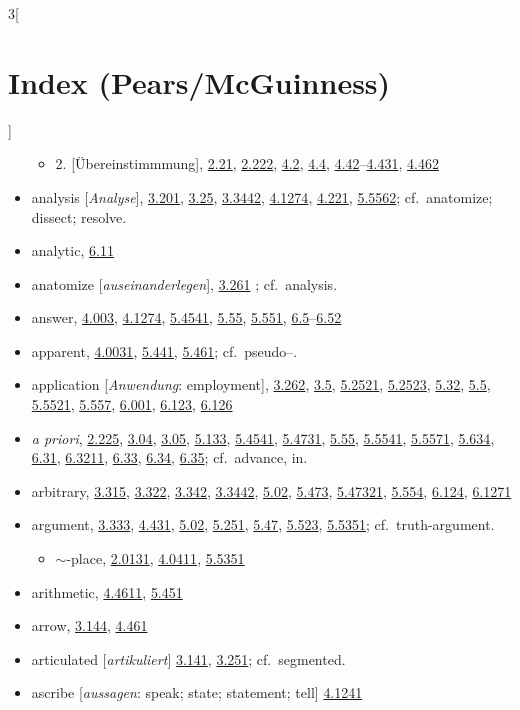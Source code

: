 \documentclass[oneside,openany,12pt]{book}
\newcommand{\indexentry}[1]{\item #1}
\newcommand{\indexsubentry}[1]{\begin{itemize} \item #1 \end{itemize}}
\newcommand{\indexref}[1]{\hyperlink{prop#1}{#1}}
\begin{document}
\begin{multicols}{3}[\section*{Index (Pears/McGuinness)}]
\begin{itemize}
   \indexsubentry{2. [\"Ubereinstimmmung], \indexref{2.21}, \indexref{2.222}, \indexref{4.2}, \indexref{4.4}, \indexref{4.42}--\indexref{4.431}, \indexref{4.462}}

\indexentry{analysis [\textit{Analyse}], \indexref{3.201}, \indexref{3.25}, \indexref{3.3442}, \indexref{4.1274}, \indexref{4.221}, \indexref{5.5562}; cf.\ anatomize; dissect; resolve.}

\indexentry{analytic, \indexref{6.11}}

\indexentry{anatomize [\textit{auseinanderlegen}], \indexref{3.261} ; cf.\ analysis.}

\indexentry{answer, \indexref{4.003}, \indexref{4.1274}, \indexref{5.4541}, \indexref{5.55}, \indexref{5.551}, \indexref{6.5}--\indexref{6.52}}

\indexentry{apparent, \indexref{4.0031}, \indexref{5.441}, \indexref{5.461}; cf.\ pseudo--.}

\indexentry{application [\textit{Anwendung}: employment], \indexref{3.262}, \indexref{3.5}, \indexref{5.2521}, \indexref{5.2523}, \indexref{5.32}, \indexref{5.5}, \indexref{5.5521}, \indexref{5.557}, \indexref{6.001}, \indexref{6.123}, \indexref{6.126}}

\indexentry{\textit{a priori}, \indexref{2.225}, \indexref{3.04}, \indexref{3.05}, \indexref{5.133}, \indexref{5.4541}, \indexref{5.4731}, \indexref{5.55}, \indexref{5.5541}, \indexref{5.5571}, \indexref{5.634}, \indexref{6.31}, \indexref{6.3211}, \indexref{6.33}, \indexref{6.34}, \indexref{6.35}; cf.\ advance, in.}

\indexentry{arbitrary, \indexref{3.315}, \indexref{3.322}, \indexref{3.342}, \indexref{3.3442}, \indexref{5.02}, \indexref{5.473}, \indexref{5.47321}, \indexref{5.554}, \indexref{6.124}, \indexref{6.1271} }

\indexentry{argument, \indexref{3.333}, \indexref{4.431}, \indexref{5.02}, \indexref{5.251}, \indexref{5.47}, \indexref{5.523}, \indexref{5.5351}; cf.\ truth-argument.}

   \indexsubentry{$\sim$-place, \indexref{2.0131}, \indexref{4.0411}, \indexref{5.5351}}

\indexentry{arithmetic, \indexref{4.4611}, \indexref{5.451}}

\indexentry{arrow, \indexref{3.144}, \indexref{4.461}}

\indexentry{articulated [\textit{artikuliert}] \indexref{3.141}, \indexref{3.251}; cf.\ segmented.}

\indexentry{ascribe [\textit{aussagen}: speak; state; statement; tell] \indexref{4.1241}}


\end{itemize}
\end{multicols}
\end{document}
